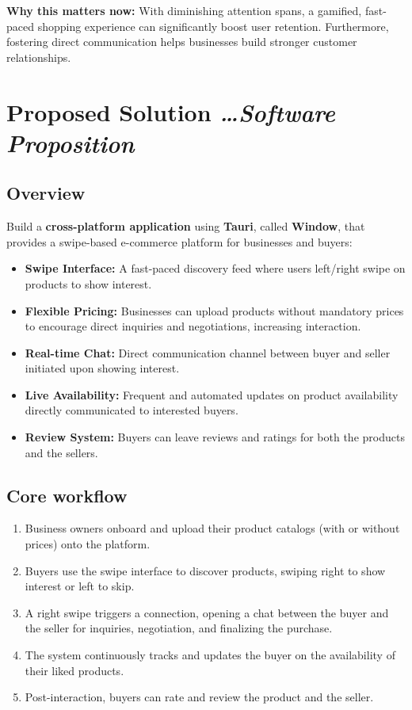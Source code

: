 \documentclass[11pt,a4paper]{article}
\newcommand{\BvrHint}[1]{%
  {\normalfont\normalsize\itshape\hfill #1}}
\begin{document}
\textbf{Why this matters now:} With diminishing attention spans, a gamified, fast-paced shopping experience can significantly boost user retention. Furthermore, fostering direct communication helps businesses build stronger customer relationships.

\section{Proposed Solution %
\BvrHint{\ldots Software Proposition}}
\subsection{Overview}
Build a \textbf{cross-platform application} using \textbf{Tauri}, called \textbf{Window}, that provides a swipe-based e-commerce platform for businesses and buyers:
\begin{itemize}[leftmargin=0.7cm]
    \item \textbf{Swipe Interface:} A fast-paced discovery feed where users left/right swipe on products to show interest.
    \item \textbf{Flexible Pricing:} Businesses can upload products without mandatory prices to encourage direct inquiries and negotiations, increasing interaction.
    \item \textbf{Real-time Chat:} Direct communication channel between buyer and seller initiated upon showing interest.
    \item \textbf{Live Availability:} Frequent and automated updates on product availability directly communicated to interested buyers.
    \item \textbf{Review System:} Buyers can leave reviews and ratings for both the products and the sellers.
\end{itemize}

\subsection{Core workflow}
\begin{enumerate}[leftmargin=0.7cm]
    \item Business owners onboard and upload their product catalogs (with or without prices) onto the platform.
    \item Buyers use the swipe interface to discover products, swiping right to show interest or left to skip.
    \item A right swipe triggers a connection, opening a chat between the buyer and the seller for inquiries, negotiation, and finalizing the purchase.
    \item The system continuously tracks and updates the buyer on the availability of their liked products.
    \item Post-interaction, buyers can rate and review the product and the seller.
\end{enumerate}
\end{document}
